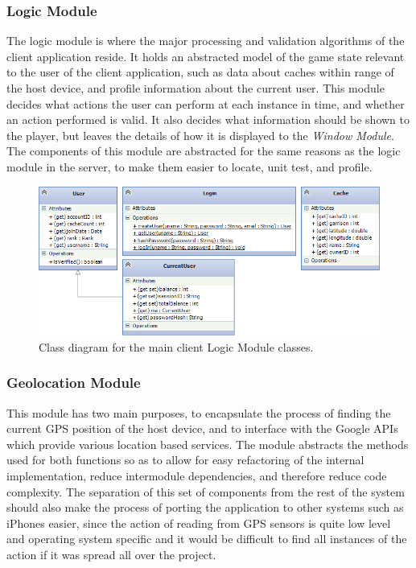 \subsubsection{Logic Module}
The logic module is where the major processing and validation algorithms of the client application reside. It holds an abstracted model of the game state relevant to the user of the client application, such as data about caches within range of the host device, and profile information about the current user. This module decides what actions the user can perform at each instance in time, and whether an action performed is valid. It also decides what information should be shown to the player, but leaves the details of how it is displayed to the \emph{Window Module}. The components of this module are abstracted for the same reasons as the logic module in the server, to make them easier to locate, unit test, and profile.

\begin{figure}[h!]
    \centering
    \includegraphics[width=\textwidth]{cllogiccd}
    \caption{Class diagram for the main client Logic Module classes.}
\end{figure}

\subsubsection{Geolocation Module}
This module has two main purposes, to encapsulate the process of finding the current GPS position of the host device, and to interface with the Google APIs which provide various location based services. The module abstracts the methods used for both functions so as to allow for easy refactoring of the internal implementation, reduce intermodule dependencies, and therefore reduce code complexity. The separation of this set of components from the rest of the system should also make the process of porting the application to other systems such as iPhones easier, since the action of reading from GPS sensors is quite low level and operating system specific and it would be difficult to find all instances of the action if it was spread all over the project.

